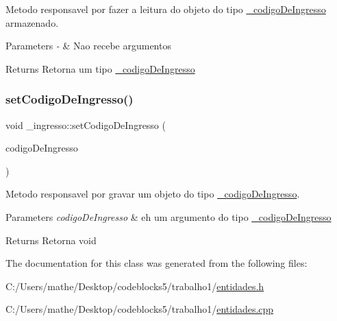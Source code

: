 Metodo responsavel por fazer a leitura do objeto do tipo \mbox{\hyperlink{class__codigo_de_ingresso}{\+\_\+codigo\+De\+Ingresso}} armazenado. 


\begin{DoxyParams}{Parameters}
{\em -\/} & Nao recebe argumentos \\
\hline
\end{DoxyParams}
\begin{DoxyReturn}{Returns}
Retorna um tipo \mbox{\hyperlink{class__codigo_de_ingresso}{\+\_\+codigo\+De\+Ingresso}} 
\end{DoxyReturn}
\mbox{\label{class__ingresso_ae45bd0d8129853559d23afad5ff52572}} 
\subsubsection{\texorpdfstring{setCodigoDeIngresso()}{setCodigoDeIngresso()}}
{\footnotesize\ttfamily void \+\_\+ingresso\+::set\+Codigo\+De\+Ingresso (\begin{DoxyParamCaption}\item[{const \mbox{\hyperlink{class__codigo_de_ingresso}{\+\_\+codigo\+De\+Ingresso}} \&}]{codigo\+De\+Ingresso }\end{DoxyParamCaption})}



Metodo responsavel por gravar um objeto do tipo \mbox{\hyperlink{class__codigo_de_ingresso}{\+\_\+codigo\+De\+Ingresso}}. 


\begin{DoxyParams}{Parameters}
{\em codigo\+De\+Ingresso} & eh um argumento do tipo \mbox{\hyperlink{class__codigo_de_ingresso}{\+\_\+codigo\+De\+Ingresso}} \\
\hline
\end{DoxyParams}
\begin{DoxyReturn}{Returns}
Retorna void 
\end{DoxyReturn}


The documentation for this class was generated from the following files\+:\begin{DoxyCompactItemize}
\item 
C\+:/\+Users/mathe/\+Desktop/codeblocks5/trabalho1/\mbox{\hyperlink{entidades_8h}{entidades.\+h}}\item 
C\+:/\+Users/mathe/\+Desktop/codeblocks5/trabalho1/\mbox{\hyperlink{entidades_8cpp}{entidades.\+cpp}}\end{DoxyCompactItemize}
